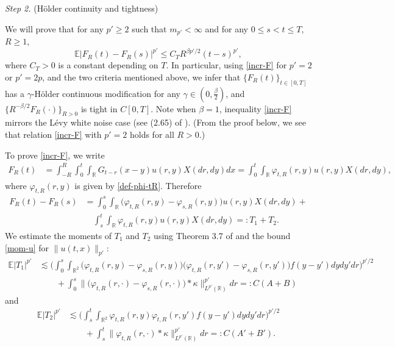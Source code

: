 \documentclass[12pt]{article}
\def\bE{\mathbb{E}}
\def\bR{\mathbb{R}}
\newcommand{\les}{\lesssim}
\def\k{\kappa}
\begin{document}
\medskip

{\em Step 2.} (H\"older continuity and tightness) 

We will prove that for any $p'\geq 2$ such that $m_{p'}<\infty$ and for any  $0\leq s<t\leq T$, $R\geq1$,
\begin{equation}
\label{incr-F}
\bE|F_R(t)-F_R(s)|^{p'} \leq C_T R^{\beta p'/2} (t-s)^{p'},
\end{equation}
where $C_T>0$ is a constant depending on $T$. In particular, 
using \eqref{incr-F} for $p'=2$ or $p'=2p$, and
the two criteria mentioned above, we infer that $\{F_R(t)\}_{t\in [0,T]}$ has a $\gamma$-H\"older continuous modification for any $\gamma \in (0,\frac{\beta}{2})$, and $\{R^{-\beta/2} F_R(\cdot)\}_{R>0}$ is tight in $C[0,T]$. Note when $\beta = 1$, inequality \eqref{incr-F} mirrors the L\'evy white noise case (see (2.65) of \cite{BZ24}). (From the proof below, we see that relation \eqref{incr-F} with $p'=2$ holds for all $R>0$.)

\medskip

To prove \eqref{incr-F}, we write
\begin{align*}
F_R(t)&=\int_{-R}^R \int_0^t \int_{\bR} G_{t-r}(x-y)u(r,y) X(dr,dy)dx 
=\int_0^t \int_{\bR}\varphi_{t,R}(r,y)u(r,y)X(dr,dy),
\end{align*}
where $\varphi_{t,R}(r,y)$ is given by \eqref{def-phi-tR}. Therefore
\begin{align*}
F_R(t)-F_R(s) &= \int_0^s \int_{\bR} \big( \varphi_{t,R}(r,y)-\varphi_{s,R}(r,y)\big)u(r,y)X(dr,dy)+\\
& \quad \int_s^t \int_{\bR}\varphi_{t,R}(r,y)u(r,y)X(dr,dy)=:T_1+T_2.
\end{align*}
We estimate the moments of $T_1$ and $T_2$ using Theorem 3.7 of \cite{BJ25} and the bound \eqref{mom-u} for $\|u(t,x)\|_{p'}$:
\begin{align*}
\bE|T_1|^{p'}  & \les \Bigg( \int_0^s  \int_{\bR^2} \big( \varphi_{t,R}(r,y)-\varphi_{s,R}(r,y)\big)
\big( \varphi_{t,R}(r,y')-\varphi_{s,R}(r,y')\big)f(y-y') dydy' dr \Bigg)^{p'/2}\\
& \quad \quad +\int_0^s \big\|\big(\varphi_{t,R}(r,\cdot)-\varphi_{s,R}(r,\cdot)\big) * \k\big\|_{L^{p'}(\bR)}^{p'} dr=:C(A+B)
\end{align*}
and
\begin{align*}
\bE|T_2|^{p'} & \les \Bigg(\int_s^t  \int_{\bR^2} \varphi_{t,R}(r,y)\varphi_{t,R}(r,y')f(y-y') dydy' dr \Bigg)^{p'/2} \\
& \quad \quad  + \int_s^t 
\|\varphi_{t,R}(r,\cdot)*  \k \|_{L^{p'}(\bR)}^{p'} dr=:C(A'+B').
\end{align*}
\end{document}
